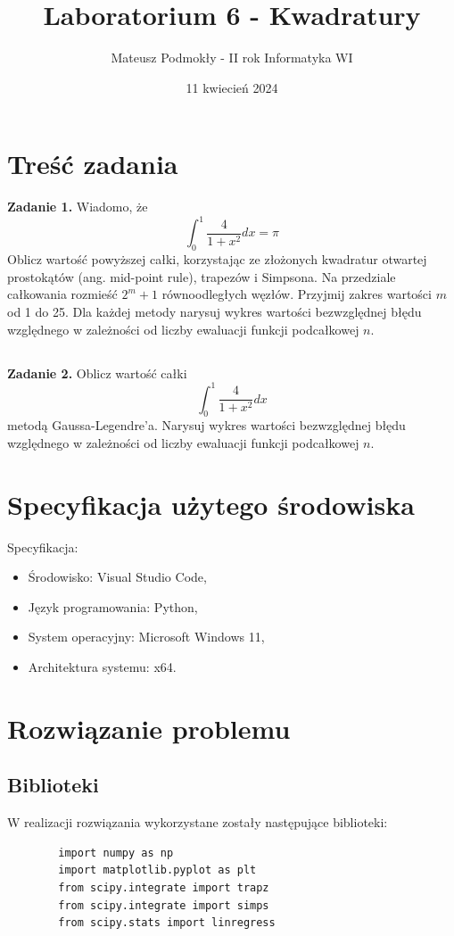 \documentclass[11pt]{scrartcl}
\title{Laboratorium 6 - Kwadratury}
\author{Mateusz Podmokły - II rok Informatyka WI}
\date{11 kwiecień 2024}
\begin{document}
    \maketitle
    \section{Treść zadania}
    \textbf{Zadanie 1.} Wiadomo, że
    \[
        \int_{0}^{1}\frac{4}{1+x^2}dx=\pi
    \]
    Oblicz wartość powyższej całki, korzystając ze złożonych
    kwadratur otwartej prostokątów (ang. mid-point rule),
    trapezów i Simpsona. Na przedziale całkowania rozmieść
    $2^m+1$ równoodległych węzłów. Przyjmij zakres
    wartości $m$ od 1 do 25. Dla każdej metody narysuj wykres
    wartości bezwzględnej błędu względnego w zależności od
    liczby ewaluacji funkcji podcałkowej $n$.
    \subsection*{}
    \textbf{Zadanie 2.} Oblicz wartość całki
    \[
        \int_{0}^{1}\frac{4}{1+x^2}dx
    \]
    metodą Gaussa-Legendre'a. Narysuj wykres wartości bezwzględnej
    błędu względnego w zależności od liczby ewaluacji funkcji
    podcałkowej $n$.

    \section{Specyfikacja użytego środowiska}
    Specyfikacja:

    \begin{itemize}
        \item Środowisko: Visual Studio Code,
        \item Język programowania: Python,
        \item System operacyjny: Microsoft Windows 11,
        \item Architektura systemu: x64.
    \end{itemize}

    \section{Rozwiązanie problemu}
    \subsection{Biblioteki}
    W realizacji rozwiązania wykorzystane zostały następujące
    biblioteki:
    \begin{lstlisting}
        import numpy as np
        import matplotlib.pyplot as plt
        from scipy.integrate import trapz
        from scipy.integrate import simps
        from scipy.stats import linregress
    \end{lstlisting}
\end{document}
